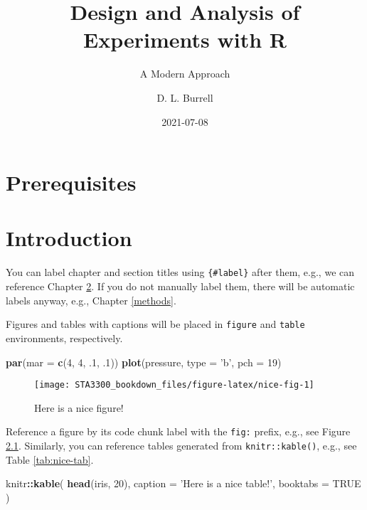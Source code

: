 \documentclass[
]{book}
\title{Design and Analysis of Experiments with R}
\subtitle{A Modern Approach}
\author{D. L. Burrell}
\date{2021-07-08}
\newenvironment{Shaded}{\begin{snugshade}}{\end{snugshade}}
\newcommand{\DataTypeTok}[1]{\textcolor[rgb]{0.13,0.29,0.53}{#1}}
\newcommand{\DecValTok}[1]{\textcolor[rgb]{0.00,0.00,0.81}{#1}}
\newcommand{\FloatTok}[1]{\textcolor[rgb]{0.00,0.00,0.81}{#1}}
\newcommand{\KeywordTok}[1]{\textcolor[rgb]{0.13,0.29,0.53}{\textbf{#1}}}
\newcommand{\NormalTok}[1]{#1}
\newcommand{\OperatorTok}[1]{\textcolor[rgb]{0.81,0.36,0.00}{\textbf{#1}}}
\newcommand{\OtherTok}[1]{\textcolor[rgb]{0.56,0.35,0.01}{#1}}
\newcommand{\StringTok}[1]{\textcolor[rgb]{0.31,0.60,0.02}{#1}}
\begin{document}
\maketitle

{
\setcounter{tocdepth}{1}
\tableofcontents
}
\hypertarget{prerequisites}{%
\chapter{Prerequisites}\label{prerequisites}}

\hypertarget{intro}{%
\chapter{Introduction}\label{intro}}

You can label chapter and section titles using \texttt{\{\#label\}} after them, e.g., we can reference Chapter \ref{intro}. If you do not manually label them, there will be automatic labels anyway, e.g., Chapter \ref{methods}.

Figures and tables with captions will be placed in \texttt{figure} and \texttt{table} environments, respectively.

\begin{Shaded}
\begin{Highlighting}[]
\KeywordTok{par}\NormalTok{(}\DataTypeTok{mar =} \KeywordTok{c}\NormalTok{(}\DecValTok{4}\NormalTok{, }\DecValTok{4}\NormalTok{, }\FloatTok{.1}\NormalTok{, }\FloatTok{.1}\NormalTok{))}
\KeywordTok{plot}\NormalTok{(pressure, }\DataTypeTok{type =} \StringTok{'b'}\NormalTok{, }\DataTypeTok{pch =} \DecValTok{19}\NormalTok{)}
\end{Highlighting}
\end{Shaded}

\begin{figure}

{\centering \texttt{[image: STA3300\_bookdown\_files/figure-latex/nice-fig-1]} 

}

\caption{Here is a nice figure!}\label{fig:nice-fig}
\end{figure}

Reference a figure by its code chunk label with the \texttt{fig:} prefix, e.g., see Figure \ref{fig:nice-fig}. Similarly, you can reference tables generated from \texttt{knitr::kable()}, e.g., see Table \ref{tab:nice-tab}.

\begin{Shaded}
\begin{Highlighting}[]
\NormalTok{knitr}\OperatorTok{::}\KeywordTok{kable}\NormalTok{(}
  \KeywordTok{head}\NormalTok{(iris, }\DecValTok{20}\NormalTok{), }\DataTypeTok{caption =} \StringTok{'Here is a nice table!'}\NormalTok{,}
  \DataTypeTok{booktabs =} \OtherTok{TRUE}
\NormalTok{)}
\end{Highlighting}
\end{Shaded}
\end{document}
